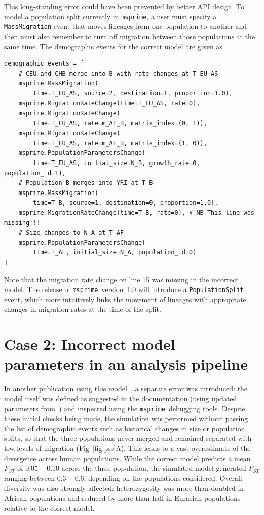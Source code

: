 \documentclass{article}
\newcommand{\msprime}[0]{\texttt{msprime}}
\begin{document}
This long-standing error could have been prevented by better API design.
To model a population split currently in \msprime, a user must specify a
\texttt{MassMigration} event that moves lineages from one population to another
and then must also remember to turn off migration
between those populations at the same time.
The demographic events for the correct model are given as


\begin{Verbatim}[xleftmargin=.5in]
demographic_events = [
    # CEU and CHB merge into B with rate changes at T_EU_AS
    msprime.MassMigration(
        time=T_EU_AS, source=2, destination=1, proportion=1.0),
    msprime.MigrationRateChange(time=T_EU_AS, rate=0),
    msprime.MigrationRateChange(
        time=T_EU_AS, rate=m_AF_B, matrix_index=(0, 1)),
    msprime.MigrationRateChange(
        time=T_EU_AS, rate=m_AF_B, matrix_index=(1, 0)),
    msprime.PopulationParametersChange(
        time=T_EU_AS, initial_size=N_B, growth_rate=0, population_id=1),
    # Population B merges into YRI at T_B
    msprime.MassMigration(
        time=T_B, source=1, destination=0, proportion=1.0),
    msprime.MigrationRateChange(time=T_B, rate=0), # NB This line was missing!!!
    # Size changes to N_A at T_AF
    msprime.PopulationParametersChange(
        time=T_AF, initial_size=N_A, population_id=0)
]
\end{Verbatim}
Note that the migration rate change on line 15 was missing in the incorrect model.
The release of \msprime\ version~1.0 will introduce a \texttt{PopulationSplit} event,
which more intuitively links the movement of lineages with appropriate changes in
migration rates at the time of the split.

\section*{Case 2: Incorrect model parameters in an analysis pipeline}

In another publication using this model~\citep{martin2017human},
a separate error was introduced: the model itself was defined as suggested
in the documentation (using updated parameters
from~\citet{gravel2011demographic}) and inspected
using the \msprime\ debugging tools.
Despite these initial checks being made, the simulation
was performed without passing the list of demographic events such as historical
changes in size or population splits, so that the three populations
never merged and remained separated with low levels of migration (Fig~\ref{fig:prs}A).
This leads to a vast overestimate of the divergence across human populations.
While the correct model predicts a mean $F_{ST}$ of
$0.05 - 0.10$ across the three population, the simulated model generated $F_{ST}$
ranging between $0.3 - 0.6$, depending on the populations considered.
Overall diversity was also strongly affected: heterozygosity was more than
doubled in African populations and reduced by more than half in Eurasian populations
relative to the correct model.
\end{document}
